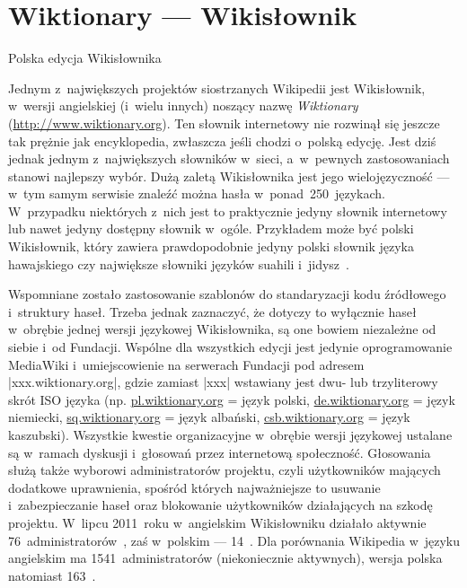 \section{Wiktionary --- Wikisłownik}
\begin{illustration}
	\caption{Polska edycja Wikisłownika}
\end{illustration}
Jednym z~największych projektów siostrzanych Wikipedii jest Wikisłownik, w~wersji angielskiej (i~wielu innych) noszący nazwę \emph{Wiktionary} (\url{http://www.wiktionary.org}). Ten słownik internetowy nie rozwinął się jeszcze tak prężnie jak encyklopedia, zwłaszcza jeśli chodzi o~polską edycję. Jest dziś jednak jednym z~największych słowników w~sieci, a~w~pewnych zastosowaniach stanowi najlepszy wybór. Dużą zaletą Wikisłownika jest jego wielojęzyczność --- w~tym samym serwisie znaleźć można hasła w~ponad~250~językach. W~przypadku niektórych z~nich jest to praktycznie jedyny słownik internetowy lub nawet jedyny dostępny słownik w~ogóle. Przykładem może być polski Wikisłownik, który zawiera prawdopodobnie jedyny polski słownik języka hawajskiego czy największe słowniki języków suahili i~jidysz~\cite{wikt:dlaczego}.

Wspomniane zostało zastosowanie szablonów do standaryzacji kodu źródłowego i~struktury haseł. Trzeba jednak zaznaczyć, że dotyczy to wyłącznie haseł w~obrębie jednej wersji językowej Wikisłownika, są one bowiem niezależne od siebie i~od Fundacji. Wspólne dla wszystkich edycji jest jedynie oprogramowanie MediaWiki i~umiejscowienie na serwerach Fundacji pod adresem \kod|xxx.wiktionary.org|, gdzie zamiast \kod|xxx| wstawiany jest dwu- lub trzyliterowy skrót ISO języka (np. \url{pl.wiktionary.org} = język polski, \url{de.wiktionary.org} = język niemiecki, \url{sq.wiktionary.org} = język albański, \url{csb.wiktionary.org} = język kaszubski). Wszystkie kwestie organizacyjne w~obrębie wersji językowej ustalane są w~ramach dyskusji i~głosowań przez internetową społeczność. Głosowania służą także wyborowi administratorów projektu, czyli użytkowników mających dodatkowe uprawnienia, spośród których najważniejsze to usuwanie i~zabezpieczanie haseł oraz blokowanie użytkowników działających na szkodę projektu. W~lipcu 2011~roku w~angielskim Wikisłowniku działało aktywnie 76~administratorów~\cite{enwikt:admin}, zaś w~polskim --- 14~\cite{wikt:admin}. Dla porównania Wikipedia w~języku angielskim ma 1541~administratorów (niekoniecznie aktywnych), wersja polska natomiast 163~\cite{wiki:admin}.

